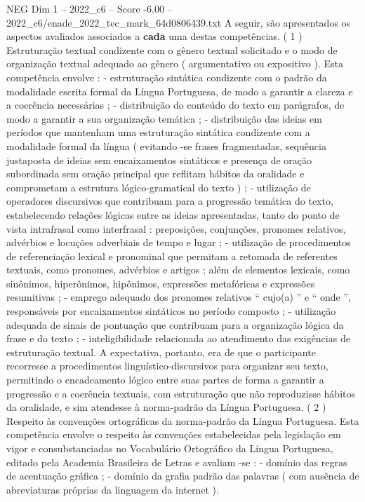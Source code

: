 \begin{textsample}{NEG Dim 1 – 2022\_c6 – Score -6.00 – 2022\_c6/enade\_2022\_tec\_mark\_64d0806439.txt}
A seguir, são apresentados os aspectos avaliados associados a \textbf{cada} uma destas competências. ( 1 ) Estruturação textual condizente com o gênero textual solicitado e o modo de organização textual adequado ao gênero ( argumentativo ou expositivo ).
Esta competência envolve : - estruturação sintática condizente com o padrão da modalidade escrita formal da Língua Portuguesa, de modo a garantir a clareza e a coerência necessárias ; - distribuição do conteúdo do texto em parágrafos, de modo a garantir a sua organização temática ; - distribuição das ideias em períodos que mantenham uma estruturação sintática condizente com a modalidade formal da língua ( evitando -se frases fragmentadas, sequência justaposta de ideias sem encaixamentos sintáticos e presença de oração subordinada sem oração principal que reflitam hábitos da oralidade e comprometam a estrutura lógico-gramatical do texto ) ; - utilização de operadores discursivos que contribuam para a progressão temática do texto, estabelecendo relações lógicas entre as ideias apresentadas, tanto do ponto de vista intrafrasal como interfrasal : preposições, conjunções, pronomes relativos, advérbios e locuções adverbiais de tempo e lugar ; - utilização de procedimentos de referenciação lexical e pronominal que permitam a retomada de referentes textuais, como pronomes, advérbios e artigos ; além de elementos lexicais, como sinônimos, hiperônimos, hipônimos, expressões metafóricas e expressões resumitivas ; - emprego adequado dos pronomes relativos “ cujo(a) ” e “ onde ”, responsáveis por encaixamentos sintáticos no período composto ; - utilização adequada de sinais de pontuação que contribuam para a organização lógica da frase e do texto ; - inteligibilidade relacionada ao atendimento das exigências de estruturação textual.
A expectativa, portanto, era de que o participante recorresse a procedimentos linguístico-discursivos para organizar seu texto, permitindo o encadeamento lógico entre suas partes de forma a garantir a progressão e a coerência textuais, com estruturação que não reproduzisse hábitos da oralidade, e sim atendesse à norma-padrão da Língua Portuguesa. ( 2 ) Respeito às convenções ortográficas da norma-padrão da Língua Portuguesa.
Esta competência envolve o respeito às convenções estabelecidas pela legislação em vigor e consubstanciadas no Vocabulário Ortográfico da Língua Portuguesa, editado pela Academia Brasileira de Letras e avaliam -se : - domínio das regras de acentuação gráfica ; - domínio da grafia padrão das palavras ( com ausência de abreviaturas próprias da linguagem da internet ).

\end{textsample}
